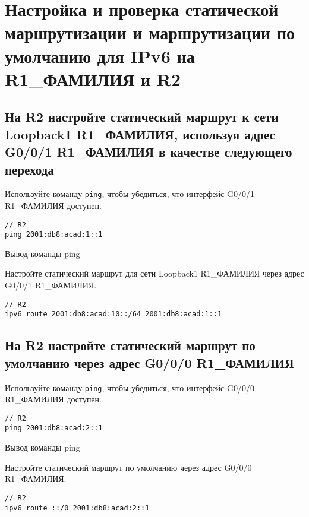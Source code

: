\section{Настройка и проверка статической маршрутизации и
маршрутизации по умолчанию для IPv6 на R1\_ФАМИЛИЯ и R2}

\subsection{На R2 настройте статический маршрут к сети Loopback1 R1\_ФАМИЛИЯ,
    используя адрес G0/0/1 R1\_ФАМИЛИЯ в качестве следующего перехода}

Используйте команду \texttt{ping}, чтобы убедиться,
что интерфейс G0/0/1 R1\_ФАМИЛИЯ доступен.

\begin{verbatim}
// R2
ping 2001:db8:acad:1::1
\end{verbatim}

\begin{image}
    \caption{Вывод команды ping}
\end{image}

Настройте статический маршрут для сети Loopback1 R1\_ФАМИЛИЯ
через адрес G0/0/1 R1\_ФАМИЛИЯ.

\begin{verbatim}
// R2
ipv6 route 2001:db8:acad:10::/64 2001:db8:acad:1::1
\end{verbatim}

\subsection{На R2 настройте статический маршрут
по умолчанию через адрес G0/0/0 R1\_ФАМИЛИЯ}

Используйте команду \texttt{ping}, чтобы убедиться,
что интерфейс G0/0/0 R1\_ФАМИЛИЯ доступен.

\begin{verbatim}
// R2
ping 2001:db8:acad:2::1
\end{verbatim}

\begin{image}
    \caption{Вывод команды ping}
\end{image}

Настройте статический маршрут по умолчанию через адрес G0/0/0 R1\_ФАМИЛИЯ.

\begin{verbatim}
// R2
ipv6 route ::/0 2001:db8:acad:2::1
\end{verbatim}

